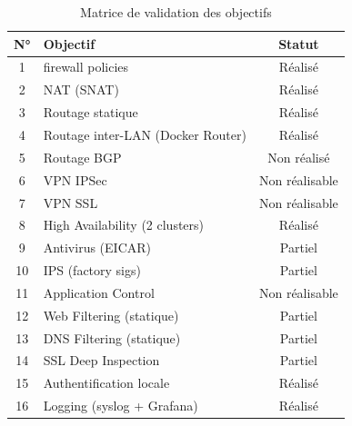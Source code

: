 \begin{table}[H]
\centering
\caption{Matrice de validation des objectifs}
\label{tab:validation}
\begin{tabularx}{\textwidth}{|c|X|c|}
\hline
\textbf{N°} & \textbf{Objectif} & \textbf{Statut} \\
\hline
1 & firewall policies & Réalisé \\
2 & NAT (SNAT) & Réalisé \\
3 & Routage statique & Réalisé \\
4 & Routage inter-LAN (Docker Router) & Réalisé \\
5 & Routage BGP & Non réalisé \\
6 & VPN IPSec & Non réalisable \\
7 & VPN SSL & Non réalisable \\
8 & High Availability (2 clusters) & Réalisé \\
9 & Antivirus (EICAR) & Partiel \\
10 & IPS (factory sigs) & Partiel \\
11 & Application Control & Non réalisable \\
12 & Web Filtering (statique) & Partiel \\
13 & DNS Filtering (statique) & Partiel \\
14 & SSL Deep Inspection & Partiel \\
15 & Authentification locale & Réalisé \\
16 & Logging (syslog + Grafana) & Réalisé \\
\hline
\end{tabularx}
\end{table}
